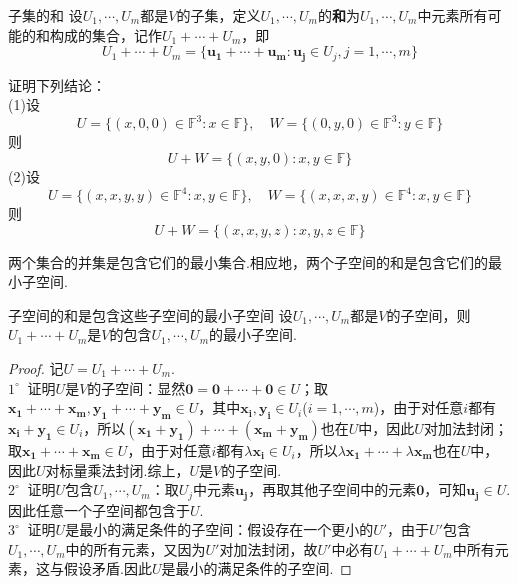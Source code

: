 \documentclass[lang=cn, zihao=5]{elegantbook}
\newcommand{\F}{\mathbb{F}}
\newcommand{\buzhou}[1]{$#1^{\circ} \ $}
\begin{document}
\begin{definition}{子集的和}
    设$U_1,\cdots ,U_m$都是$V$的子集，定义$U_1, \cdots ,U_m$的\textbf{和}为$U_1, \cdots ,U_m$中元素所有可能的和构成的集合，记作$U_1+ \cdots +U_m$，即$$U_1+ \cdots +U_m = \{ \boldsymbol{u_1}+ \cdots +\boldsymbol{u_m} : \boldsymbol{u_j} \in U_j,j=1, \cdots ,m \}$$
\end{definition}

\begin{example}
    证明下列结论： \\
    (1)设$$U = \{ (x,0,0) \in \F ^{3} : x \in \F \} , \quad W = \{ (0,y,0) \in \F ^{3} : y \in \F \}$$
    则$$U+W = \{ (x,y,0) : x,y \in \F \}$$
    (2)设$$U = \{ (x,x,y,y) \in \F ^{4} : x,y \in \F \} , \quad W = \{ (x,x,x,y) \in \F ^{4} : x,y \in \F \}$$
    则$$U+W = \{ (x,x,y,z) : x,y,z \in \F \}$$
\end{example}

两个集合的并集是包含它们的最小集合.相应地，两个子空间的和是包含它们的最小子空间.

\begin{proposition}{子空间的和是包含这些子空间的最小子空间}
    设$U_1,\cdots ,U_m$都是$V$的子空间，则$U_1+\cdots +U_m$是$V$的包含$U_1,\cdots ,U_m$的最小子空间.
\end{proposition}
\begin{proof}
    记$U=U_1+\cdots +U_m$. \\
    \buzhou{1} 证明$U$是$V$的子空间：显然$\boldsymbol{0}=\boldsymbol{0} + \cdots + \boldsymbol{0} \in U$；取$\boldsymbol{x_1}+ \cdots +\boldsymbol{x_m},\boldsymbol{y_1}+ \cdots +\boldsymbol{y_m} \in U$，其中$\boldsymbol{x_i},\boldsymbol{y_i} \in U_i$($i=1,\cdots ,m$)，由于对任意$i$都有$\boldsymbol{x_i}+\boldsymbol{y_1} \in U_i$，所以$(\boldsymbol{x_1}+\boldsymbol{y_1}) + \cdots + (\boldsymbol{x_m}+\boldsymbol{y_m})$也在$U$中，因此$U$对加法封闭；取$\boldsymbol{x_1}+ \cdots +\boldsymbol{x_m} \in U$，由于对任意$i$都有$\lambda \boldsymbol{x_i} \in U_i$，所以$\lambda \boldsymbol{x_1} + \cdots + \lambda \boldsymbol{x_m}$也在$U$中，因此$U$对标量乘法封闭.综上，$U$是$V$的子空间.\\
    \buzhou{2} 证明$U$包含$U_1,\cdots ,U_m$：取$U_j$中元素$\boldsymbol{u_j}$，再取其他子空间中的元素$\boldsymbol{0}$，可知$\boldsymbol{u_j} \in U$.因此任意一个子空间都包含于$U$. \\
    \buzhou{3} 证明$U$是最小的满足条件的子空间：假设存在一个更小的$U'$，由于$U'$包含$U_1, \cdots ,U_m$中的所有元素，又因为$U'$对加法封闭，故$U'$中必有$U_1+ \cdots +U_m$中所有元素，这与假设矛盾.因此$U$是最小的满足条件的子空间.
\end{proof}
\end{document}
